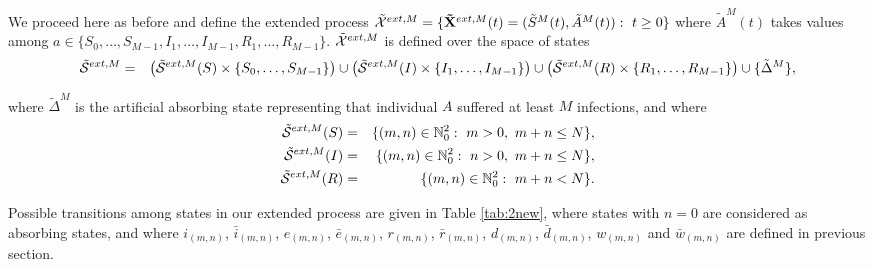 \documentclass[10pt,A4paper]{article}
\begin{document}
\par We proceed here as before and define the extended process ${\cal \tilde X}^{ext,M}=\{{\bf \tilde X}^{ext,M}(t)=({\tilde S}^M(t),{\tilde A}^M(t)):\ t\geq0\}$ where
${\tilde A}^M(t)$ takes values among $a\in\{S_0,\dots,S_{M-1},I_1,\dots,I_{M-1},R_1,\dots,R_{M-1}\}$. ${\cal \tilde X}^{ext,M}$ is defined over the
space of states
\begin{eqnarray*}
 {\cal \tilde S}^{ext,M} &=& \left({\cal \tilde S}^{ext,M}(S)\times\{S_0,\dots,S_{M-1}\}\right)\cup\left({\cal \tilde S}^{ext,M}(I)\times\{I_1,\dots,I_{M-1}\}\right)\cup\left({\cal \tilde S}^{ext,M}(R)\times\{R_1,\dots,R_{M-1}\}\right)\cup\{{\tilde \Delta}^M\},
\end{eqnarray*}
\par\noindent where ${\tilde \Delta}^M$ is the artificial absorbing state representing that individual $A$ suffered at least $M$ infections, and
where
\begin{eqnarray*}
 {\cal \tilde S}^{ext,M}(S) &=& \{(m,n)\in\mathbb{N}_0^2:\ m>0,\ m+n\leq N\},\\
{\cal \tilde S}^{ext,M}(I) &=& \{(m,n)\in\mathbb{N}_0^2:\ n>0,\ m+n\leq N\},\\
{\cal \tilde S}^{ext,M}(R) &=& \{(m,n)\in\mathbb{N}_0^2:\ m+n<N\}.
\end{eqnarray*}

\par\noindent Possible transitions among states in our extended process are given in Table \ref{tab:2new}, where states
with $n=0$ are considered as absorbing states, and where $i_{(m,n)}$, ${\bar i}_{(m,n)}$, $e_{(m,n)}$, ${\bar e}_{(m,n)}$, $r_{(m,n)}$, ${\bar r}_{(m,n)}$,
$d_{(m,n)}$, ${\bar d}_{(m,n)}$, $w_{(m,n)}$ and ${\bar w}_{(m,n)}$ are defined in previous section.
\end{document}
